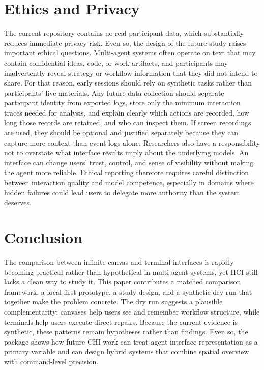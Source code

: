 \documentclass[sigconf]{acmart}
\begin{document}
\section{Ethics and Privacy}
The current repository contains no real participant data, which substantially reduces immediate privacy risk. Even so, the design of the future study raises important ethical questions. Multi-agent systems often operate on text that may contain confidential ideas, code, or work artifacts, and participants may inadvertently reveal strategy or workflow information that they did not intend to share. For that reason, early sessions should rely on synthetic tasks rather than participants' live materials. Any future data collection should separate participant identity from exported logs, store only the minimum interaction traces needed for analysis, and explain clearly which actions are recorded, how long those records are retained, and who can inspect them. If screen recordings are used, they should be optional and justified separately because they can capture more context than event logs alone. Researchers also have a responsibility not to overstate what interface results imply about the underlying models. An interface can change users' trust, control, and sense of visibility without making the agent more reliable. Ethical reporting therefore requires careful distinction between interaction quality and model competence, especially in domains where hidden failures could lead users to delegate more authority than the system deserves.

\section{Conclusion}
The comparison between infinite-canvas and terminal interfaces is rapidly becoming practical rather than hypothetical in multi-agent systems, yet HCI still lacks a clean way to study it. This paper contributes a matched comparison framework, a local-first prototype, a study design, and a synthetic dry run that together make the problem concrete. The dry run suggests a plausible complementarity: canvases help users see and remember workflow structure, while terminals help users execute direct repairs. Because the current evidence is synthetic, these patterns remain hypotheses rather than findings. Even so, the package shows how future CHI work can treat agent-interface representation as a primary variable and can design hybrid systems that combine spatial overview with command-level precision.



\end{document}
